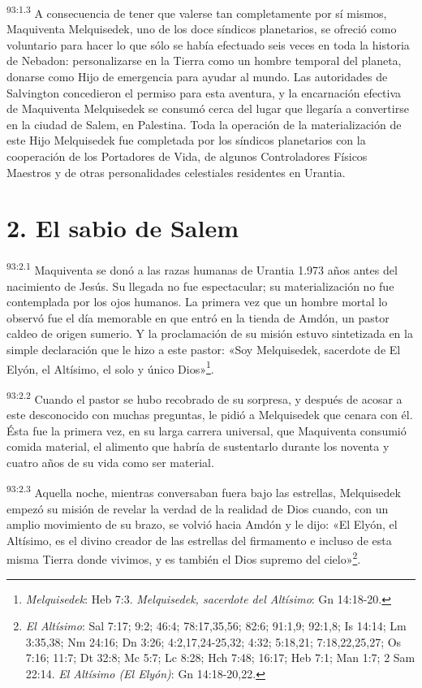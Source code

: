 \par
\textsuperscript{93:1.3} A consecuencia de tener que valerse tan completamente por sí mismos, Maquiventa Melquisedek, uno de los doce síndicos planetarios, se ofreció como voluntario para hacer lo que sólo se había efectuado seis veces en toda la historia de Nebadon: personalizarse en la Tierra como un hombre temporal del planeta, donarse como Hijo de emergencia para ayudar al mundo. Las autoridades de Salvington concedieron el permiso para esta aventura, y la encarnación efectiva de Maquiventa Melquisedek se consumó cerca del lugar que llegaría a convertirse en la ciudad de Salem, en Palestina. Toda la operación de la materialización de este Hijo Melquisedek fue completada por los síndicos planetarios con la cooperación de los Portadores de Vida, de algunos Controladores Físicos Maestros y de otras personalidades celestiales residentes en Urantia.

\section*{2. El sabio de Salem}
\par
\textsuperscript{93:2.1} Maquiventa se donó a las razas humanas de Urantia 1.973 años antes del nacimiento de Jesús. Su llegada no fue espectacular; su materialización no fue contemplada por los ojos humanos. La primera vez que un hombre mortal lo observó fue el día memorable en que entró en la tienda de Amdón, un pastor caldeo de origen sumerio. Y la proclamación de su misión estuvo sintetizada en la simple declaración que le hizo a este pastor: «Soy Melquisedek, sacerdote de El Elyón, el Altísimo, el solo y único Dios»\footnote{\textit{Melquisedek}: Heb 7:3. \textit{Melquisedek, sacerdote del Altísimo}: Gn 14:18-20.}.

\par
\textsuperscript{93:2.2} Cuando el pastor se hubo recobrado de su sorpresa, y después de acosar a este desconocido con muchas preguntas, le pidió a Melquisedek que cenara con él. Ésta fue la primera vez, en su larga carrera universal, que Maquiventa consumió comida material, el alimento que habría de sustentarlo durante los noventa y cuatro años de su vida como ser material.

\par
\textsuperscript{93:2.3} Aquella noche, mientras conversaban fuera bajo las estrellas, Melquisedek empezó su misión de revelar la verdad de la realidad de Dios cuando, con un amplio movimiento de su brazo, se volvió hacia Amdón y le dijo: «El Elyón, el Altísimo, es el divino creador de las estrellas del firmamento e incluso de esta misma Tierra donde vivimos, y es también el Dios supremo del cielo»\footnote{\textit{El Altísimo}: Sal 7:17; 9:2; 46:4; 78:17,35,56; 82:6; 91:1,9; 92:1,8; Is 14:14; Lm 3:35,38; Nm 24:16; Dn 3:26; 4:2,17,24-25,32; 4:32; 5:18,21; 7:18,22,25,27; Os 7:16; 11:7; Dt 32:8; Mc 5:7; Lc 8:28; Hch 7:48; 16:17; Heb 7:1; Man 1:7; 2 Sam 22:14. \textit{El Altísimo (El Elyón)}: Gn 14:18-20,22.}.


